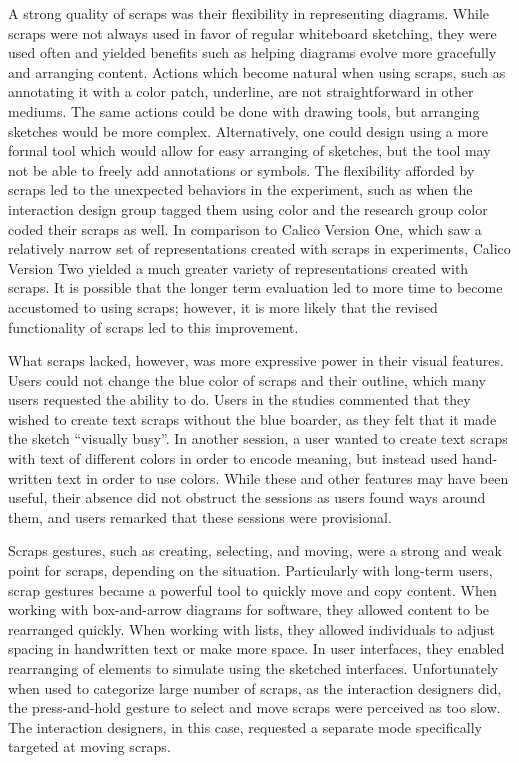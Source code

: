 A strong quality of scraps was their flexibility in representing diagrams. While scraps were not always used in favor of regular whiteboard sketching, they were used often and yielded benefits such as helping diagrams evolve more gracefully and arranging content. Actions which become natural when using scraps, such as annotating it with a color patch, underline, are not straightforward in other mediums. The same actions could be done with drawing tools, but arranging sketches would be more complex. Alternatively, one could design using a more formal tool which would allow for easy arranging of sketches, but the tool may not be able to freely add annotations or symbols. The flexibility afforded by scraps led to the unexpected behaviors in the experiment, such as when the interaction design group tagged them using color and the research group color coded their scraps as well. In comparison to Calico Version One, which saw a relatively narrow set of representations created with scraps in experiments, Calico Version Two yielded a much greater variety of representations created with scraps. It is possible that the longer term evaluation led to more time to become accustomed to using scraps; however, it is more likely that the revised functionality of scraps led to this improvement.

What scraps lacked, however, was more expressive power in their visual features. Users could not change the blue color of scraps and their outline, which many users requested the ability to do. Users in the studies commented that they wished to create text scraps without the blue boarder, as they felt that it made the sketch ``visually busy''. In another session, a user wanted to create text scraps with text of different colors in order to encode meaning, but instead used hand-written text in order to use colors. While these and other features may have been useful, their absence did not obstruct the sessions as users found ways around them, and users remarked that these sessions were provisional.

Scraps gestures, such as creating, selecting, and moving, were a strong and weak point for scraps, depending on the situation. Particularly with long-term users, scrap gestures became a powerful tool to quickly move and copy content. When working with box-and-arrow diagrams for software, they allowed content to be rearranged quickly. When working with lists, they allowed individuals to adjust spacing in handwritten text or make more space. In user interfaces, they enabled rearranging of elements to simulate using the sketched interfaces. Unfortunately when used to categorize large number of scraps, as the interaction designers did, the press-and-hold gesture to select and move scraps were perceived as too slow. The interaction designers, in this case, requested a separate mode specifically targeted at moving scraps.

